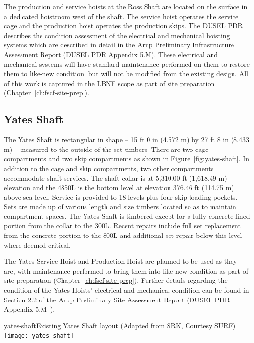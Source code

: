 The production and service hoists at the Ross Shaft are located on the surface in a dedicated hoistroom west of the shaft. The service hoist operates the service cage and the production hoist operates the production skips. The DUSEL PDR~\cite{dusel-pdr} describes the condition assessment of the electrical and mechanical hoisting systems which are described in detail in the Arup Preliminary Infrastructure Assessment Report (DUSEL PDR Appendix 5.M). These electrical and mechanical systems will have standard maintenance performed on them to restore them to like-new condition, but will not be modified from the existing design. %
All of this work is captured in the LBNF scope as part of site preparation (Chapter~\ref{ch:fscf-site-prep}).

\subsection{Yates Shaft}
\label{sec:fscf-und-shafts-yates}

The Yates Shaft is rectangular in shape -- 15 ft 0 in (4.572 m) by 27 ft 8 in (8.433 m) -- measured to the outside of the set timbers. There are two cage compartments and two skip compartments as shown in Figure~\ref{fig:yates-shaft}. In addition to the cage and skip compartments, two other compartments accommodate shaft services. The shaft collar is at 5,310.00 ft (1,618.49 m) elevation and the 4850L is the bottom level at elevation 376.46 ft (114.75 m) above sea level. Service is provided to 18 levels plus four skip-loading pockets. Sets are made up of various length and size timbers located so as to maintain compartment spaces. 
 The Yates Shaft is timbered except for a fully concrete-lined portion from the collar to the 300L. Recent repairs include full set replacement from the concrete portion to the 800L and additional set repair below this level where deemed critical.

The Yates Service Hoist and Production Hoist are planned to be used as they are, with maintenance performed to bring them into like-new condition as part of site preparation (Chapter~\ref{ch:fscf-site-prep}). Further details regarding the condition of the Yates Hoists' electrical and mechanical condition can be found in Section 2.2 of the Arup Preliminary Site Assessment Report (DUSEL PDR Appendix 5.M~\cite{dusel-pdr}).

\begin{cdrfigure}{yates-shaft}{Existing Yates Shaft layout (Adapted from SRK, Courtesy SURF)}
\texttt{[image: yates-shaft]}
\end{cdrfigure}



